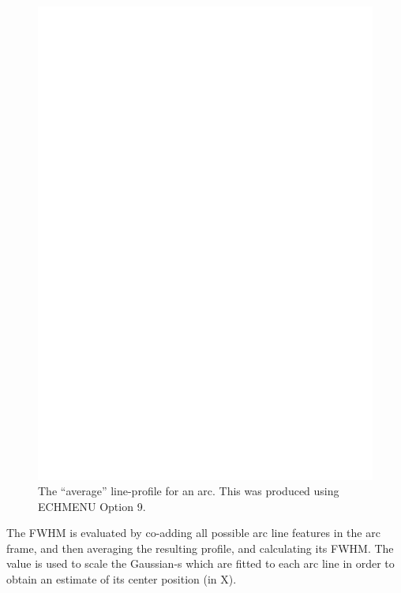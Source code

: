 \documentclass[twoside,11pt]{article}
\renewcommand{\_}{\texttt{\symbol{95}}}
\newcommand{\sunspec}[2]{#1}
\newcommand{\sunspec}[2]{#2}
\begin{document}
\begin{figure}
\begin{center}
\includegraphics[width=\textwidth]{sun152_07.eps}

\parbox{140mm}{
\caption{The ``average'' line-profile for an arc.  This was produced using
ECHMENU Option 9.}
\label{fi_linewidth}
}
\end{center}
\end{figure}

The FWHM is evaluated by co-adding all possible arc line features in the
arc frame, and then averaging the resulting profile, and calculating its
FWHM. The value is used to scale the Gaussian-s which are fitted to each
arc line in order to obtain an estimate of its center position (in X).
\end{document}
